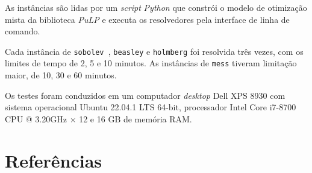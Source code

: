 \documentclass[]{article}
\newcommand{ \python }[1]{\textit{#1}}
\newcommand{ \instance }[1]{\texttt{#1}}
\newif\ifartigo
\begin{document}
		As instâncias são lidas por um \textit{script} \python{Python} \cite{Python} que constrói o modelo de otimização mista da biblioteca \python{PuLP} \cite{PuLP} e executa os resolvedores pela interface de linha de comando.   
		 
		Cada instância de \instance{sobolev	}, \instance{beasley} e \instance{holmberg} foi resolvida três vezes, com os limites de tempo de 2, 5 e 10 minutos.
		As instâncias de \texttt{mess} tiveram limitação maior, de 10, 30 e 60 minutos.
		
		Os testes foram conduzidos em um computador \textit{desktop} Dell XPS 8930 com sistema operacional Ubuntu 22.04.1 LTS 64-bit, processador Intel{\textregistered} Core{\texttrademark} i7-8700 CPU @ 3.20GHz $\times$ 12 e 16 GB de memória RAM.    		
		\ifartigo
			Os resultados estão nas tabelas \ref{cflp:tab:1}, \ref{cflp:tab:4}, \ref{cflp:tab:5}, \ref{cflp:tab:6} e \ref{cflp:tab:0}.
		\fi	
		
		

	\vfill
	\section{Referências}
		
		
\ifartigo		
	\vfill
	\section{Tabelas}
	\newpage
		\begin{sidewaystable}[]
			
		\end{sidewaystable}	
		
		\begin{sidewaystable}[]
			
			
			
		\end{sidewaystable}	
		
		\begin{sidewaystable}[]	
			
		\end{sidewaystable}		
		
\fi		
\end{document}

